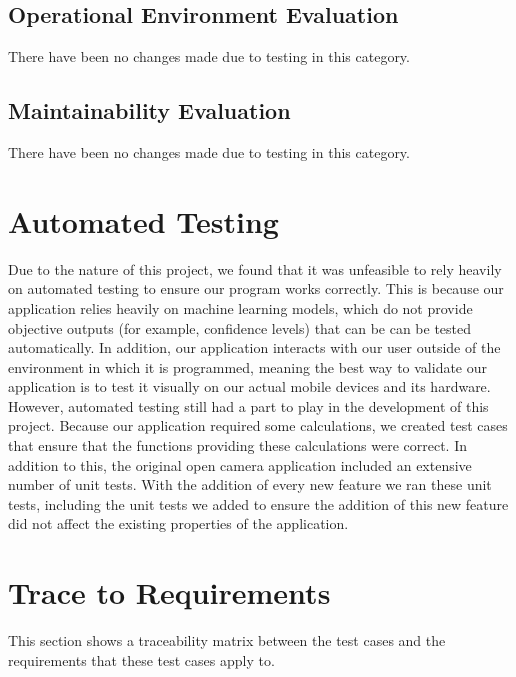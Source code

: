\documentclass[12pt, titlepage]{article}
\begin{document}
\subsection{Operational Environment Evaluation}
There have been no changes made due to testing in this category.

\subsection{Maintainability Evaluation}
There have been no changes made due to testing in this category.

\section{Automated Testing}
Due to the nature of this project, we found that it was unfeasible to rely heavily on automated testing to ensure our program works correctly. This is because our application relies heavily on machine learning models, which do not provide objective outputs (for example, confidence levels) that can be can be tested automatically. In addition, our application interacts with our user outside of the environment in which it is programmed, meaning the best way to validate our application is to test it visually on our actual mobile devices and its hardware.\\

However, automated testing still had a part to play in the development of this project. Because our application required some calculations, we created test cases that ensure that the functions providing these calculations were correct. In addition to this, the original open camera application included an extensive number of unit tests. With the addition of every new feature we ran these unit tests, including the unit tests we added to ensure the addition of this new feature did not affect the existing properties of the application.
		
\section{Trace to Requirements}
This section shows a traceability matrix between the test cases and the requirements that these test cases apply to.
		
\end{document}

